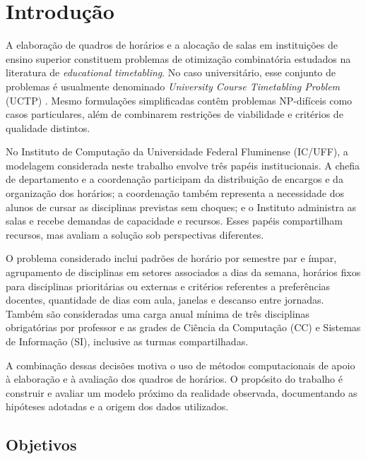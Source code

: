 \section{Introdução}
\label{sec:introducao}

A elaboração de quadros de horários e a alocação de salas em instituições de ensino superior constituem problemas de otimização combinatória estudados na literatura de \textit{educational timetabling}. No caso universitário, esse conjunto de problemas é usualmente denominado \textit{University Course Timetabling Problem} (UCTP) \cite{schaerf1999survey,lewis2008survey}. Mesmo formulações simplificadas contêm problemas NP-difíceis como casos particulares, além de combinarem restrições de viabilidade e critérios de qualidade distintos.

No Instituto de Computação da Universidade Federal Fluminense (IC/UFF), a modelagem considerada neste trabalho envolve três papéis institucionais. A chefia de departamento e a coordenação participam da distribuição de encargos e da organização dos horários; a coordenação também representa a necessidade dos alunos de cursar as disciplinas previstas sem choques; e o Instituto administra as salas e recebe demandas de capacidade e recursos. Esses papéis compartilham recursos, mas avaliam a solução sob perspectivas diferentes.

O problema considerado inclui padrões de horário por semestre par e ímpar, agrupamento de disciplinas em setores associados a dias da semana, horários fixos para disciplinas prioritárias ou externas e critérios referentes a preferências docentes, quantidade de dias com aula, janelas e descanso entre jornadas. Também são consideradas uma carga anual mínima de três disciplinas obrigatórias por professor e as grades de Ciência da Computação (CC) e Sistemas de Informação (SI), inclusive as turmas compartilhadas. 

A combinação dessas decisões motiva o uso de métodos computacionais de apoio à elaboração e à avaliação dos quadros de horários. O propósito do trabalho é construir e avaliar um modelo próximo da realidade observada, documentando as hipóteses adotadas e a origem dos dados utilizados.

\subsection{Objetivos}
\label{subsec:objetivos}

